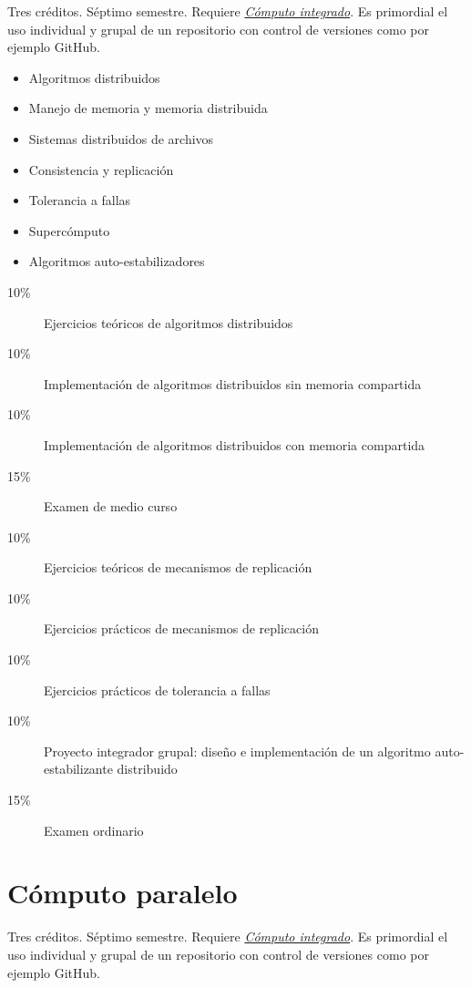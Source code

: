 \documentclass{article}
\begin{document}
\begin{multicols}{4}
Tres cr\'{e}ditos. S\'{e}ptimo semestre. Requiere \hyperlink{ci}{\em
  C\'{o}mputo integrado}. Es primordial el uso individual y grupal de
un repositorio con control de versiones como por ejemplo GitHub.

\begin{itemize}
\item{Algoritmos distribuidos}
\item{Manejo de memoria y memoria distribuida}
\item{Sistemas distribuidos de archivos}
\item{Consistencia y replicaci\'{o}n}
\item{Tolerancia a fallas}
\item{Superc\'{o}mputo}
\item{Algoritmos auto-estabilizadores}
\end{itemize}

\begin{description}
\item[10\%]{Ejercicios te\'{o}ricos de algoritmos distribuidos}
\item[10\%]{Implementaci\'{o}n de algoritmos distribuidos sin memoria compartida}
\item[10\%]{Implementaci\'{o}n de algoritmos distribuidos con memoria compartida}  
\item[15\%]{Examen de medio curso}
\item[10\%]{Ejercicios te\'{o}ricos de mecanismos de replicaci\'{o}n}
\item[10\%]{Ejercicios pr\'{a}cticos de mecanismos de replicaci\'{o}n}
\item[10\%]{Ejercicios pr\'{a}cticos de tolerancia a fallas}      
\item[10\%]{Proyecto integrador grupal: dise\~{n}o e implementaci\'{o}n de un
  algoritmo auto-estabilizante distribuido}
\item[15\%]{Examen ordinario}
\end{description}  

\vfill\null \columnbreak

\hypertarget{cp}{\section*{C\'{o}mputo paralelo}} 

Tres cr\'{e}ditos. S\'{e}ptimo semestre. Requiere \hyperlink{ci}{\em
  C\'{o}mputo integrado}.  Es primordial el uso individual y grupal de
un repositorio con control de versiones como por ejemplo GitHub.


\end{multicols}
\end{document}
